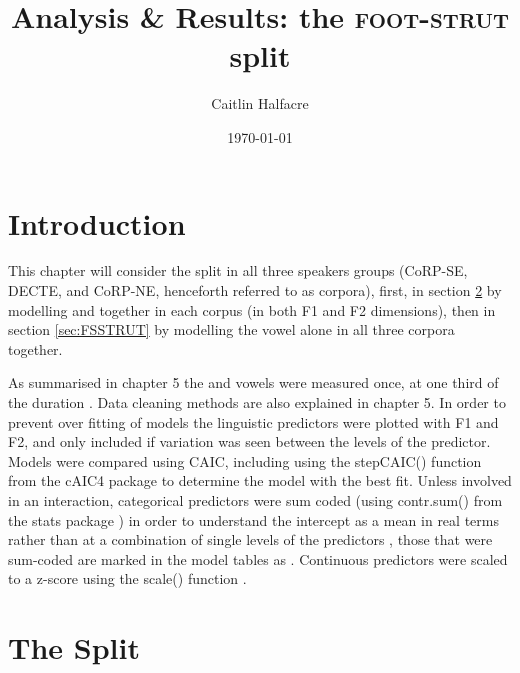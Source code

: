 \documentclass[../../../00.FullDoc/tex/ThesisSkeleton-draft2]{subfiles}
\title{Analysis \& Results: the \textsc{foot}-\textsc{strut} split}
\author{Caitlin Halfacre}
\date{\today}
\begin{document}
	\newcommand{\onlyinsubfile}[1]{#1}
	\newcommand{\notinsubfile}[1]{}
		\maketitle
		\pagebreak
		\tableofcontents
		\onehalfspacing
	\pagestyle{scrheadings}
	
\section{Introduction} \label{sec:FSintro}

This chapter will consider the \FS{} split in all three speakers groups (CoRP-SE, DECTE, and CoRP-NE, henceforth referred to as corpora), first, in section \ref{sec:FSSplit} by modelling \foot{} and \strutt{} together in each corpus (in both F1 and F2 dimensions), then in section \ref{sec:FSSTRUT} by modelling the \strutt{} vowel alone in all three corpora together.

As summarised in chapter \onlyinsubfile{5}\notinsubfile{\ref{ch:Methodology}} the \foot{} and \strutt{} vowels were measured once, at one third of the duration \citep{FAVE}. Data cleaning methods are also explained in chapter \onlyinsubfile{5}\notinsubfile{\ref{ch:Methodology}}.
In order to prevent over fitting of models the linguistic predictors were plotted with F1 and F2, and only included if variation was seen between the levels of the predictor. Models were compared using CAIC, including using the stepCAIC() function from the cAIC4 package \citep{cAIC4} to determine the model with the best fit. Unless involved in an interaction, categorical predictors were sum coded (using contr.sum() from the stats package \citealt{RCoreTeam2021}) in order to understand the intercept as a mean in real terms rather than at a combination of single levels of the predictors \cite{Winter2019}, those that were sum-coded are marked in the model tables as . Continuous predictors were scaled to a z-score using the scale() function \citep{RCoreTeam2021}.
 
\section{The  Split}	 \label{sec:FSSplit}
\end{document}

